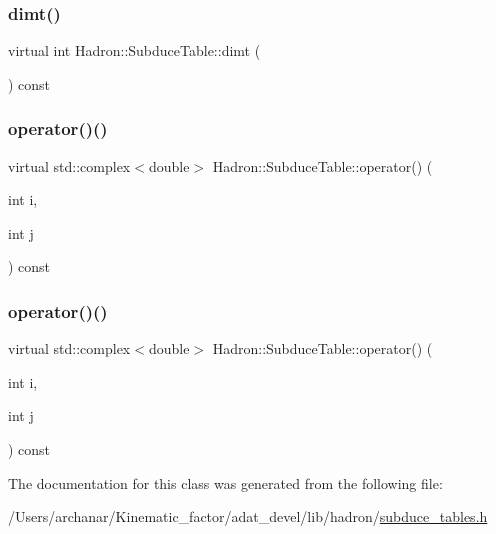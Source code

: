 \subsubsection{\texorpdfstring{dimt()}{dimt()}\hspace{0.1cm}{\footnotesize\ttfamily [2/2]}}
{\footnotesize\ttfamily virtual int Hadron\+::\+Subduce\+Table\+::dimt (\begin{DoxyParamCaption}{ }\end{DoxyParamCaption}) const\hspace{0.3cm}{\ttfamily [pure virtual]}}

\mbox{\label{classHadron_1_1SubduceTable_a999cf73415a42ed70a12a5c49dc24b0f}} 
\subsubsection{\texorpdfstring{operator()()}{operator()()}\hspace{0.1cm}{\footnotesize\ttfamily [1/2]}}
{\footnotesize\ttfamily virtual std\+::complex$<$double$>$ Hadron\+::\+Subduce\+Table\+::operator() (\begin{DoxyParamCaption}\item[{int}]{i,  }\item[{int}]{j }\end{DoxyParamCaption}) const\hspace{0.3cm}{\ttfamily [pure virtual]}}

\mbox{\label{classHadron_1_1SubduceTable_a999cf73415a42ed70a12a5c49dc24b0f}} 
\subsubsection{\texorpdfstring{operator()()}{operator()()}\hspace{0.1cm}{\footnotesize\ttfamily [2/2]}}
{\footnotesize\ttfamily virtual std\+::complex$<$double$>$ Hadron\+::\+Subduce\+Table\+::operator() (\begin{DoxyParamCaption}\item[{int}]{i,  }\item[{int}]{j }\end{DoxyParamCaption}) const\hspace{0.3cm}{\ttfamily [pure virtual]}}



The documentation for this class was generated from the following file\+:\begin{DoxyCompactItemize}
\item 
/\+Users/archanar/\+Kinematic\+\_\+factor/adat\+\_\+devel/lib/hadron/\mbox{\hyperlink{lib_2hadron_2subduce__tables_8h}{subduce\+\_\+tables.\+h}}\end{DoxyCompactItemize}
